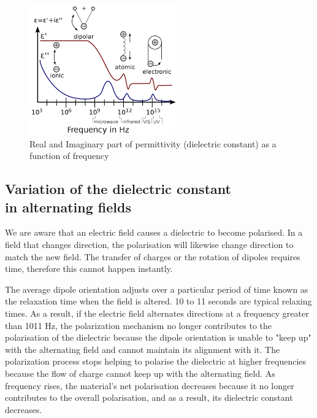 	\begin{figure}[H]
		\centering
		\label{fig:1}
		\includegraphics[width=0.8\columnwidth]{images/t1.png}
		\caption{Real and Imaginary part of permittivity (dielectric constant) as a function of frequency}
	\end{figure}
	
	\subsection{Variation of the dielectric constant\\
	in alternating fields}
		We are aware that an electric field causes a dielectric to become polarised. In a field that changes direction, the polarisation will likewise change direction to match the new field. The transfer of charges or the rotation of dipoles requires time, therefore this cannot happen instantly.

		The average dipole orientation adjusts over a particular period of time known as the relaxation time when the field is altered. 10 to 11 seconds are typical relaxing times. As a result, if the electric field alternates directions at a frequency greater than 1011 Hz, the polarization mechanism no longer contributes to the polarisation of the dielectric because the dipole orientation is unable to "keep up" with the alternating field and cannot maintain its alignment with it. The polarization process stops helping to polarise the dielectric at higher frequencies because the flow of charge cannot keep up with the alternating field. As frequency rises, the material's net polarisation decreases because it no longer contributes to the overall polarisation, and as a result, its dielectric constant decreases.

